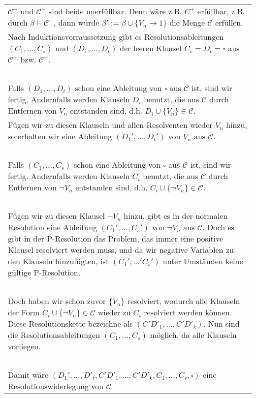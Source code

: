 \documentclass[a4paper,10pt]{article}
\newcommand{\tabspace}{15cm}
\begin{document}
\begin{itemize}
		\begin{tabular}{@{} p{\tabspace}}
		$\mathcal{C}^+$ und $\mathcal{C}^-$ sind beide unerfüllbar. Denn wäre z.B. $C^+$ erfüllbar, z.B. durch $\beta \vDash \mathcal{C}^+$, dann würde $\beta' := \beta \cup \{V_n \rightarrow 1 \}$ die Menge $\mathcal{C}$ erfüllen. \\
		Nach Induktionsvorraussetzung gibt es Resolutionsableitungen $(C_1,...,C_s)$ und $(D_1,...,D_t)$ der leeren Klausel $C_s = D_t = \square$ aus $\mathcal{C}^+$ bzw. $\mathcal{C}^-$. \\
		 \ \\
		Falls  $(D_1,...,D_t)$  schon eine Ableitung von $\square$ aus $\mathcal{C}$ ist, sind wir fertig. Andernfalls werden Klauseln $D_i$ benutzt, die aus $\mathcal{C}$ durch Entfernen von $V_n$ entstanden sind, d.h. $D_i \cup \{V_n \} \in \mathcal{C}$. \\
		Fügen wir zu diesen Klauseln und allen Resolventen wieder $V_n$ hinzu, so erhalten wir eine Ableitung $(D_1',...,D_t')$ von $V_n$ aus $\mathcal{C}$. \\
		 \ \\
		 Falls $(C_1,..., C_s)$ schon eine Ableitung von $\square$ aus $\mathcal{C}$ ist, sind wir fertig. Andernfalls werden Klauseln $C_i$ benutzt, die aus $\mathcal{C}$ durch Entfernen von $\lnot V_n$ entstanden sind, d.h. $C_i \cup \{\lnot V_n \} \in \mathcal{C}$. \\
		\ \\
		Fügen wir zu diesen Klausel $\lnot V_n$ hinzu, gibt es in der normalen Resolution eine Ableitung $(C_1',...,C_s')$ von $\lnot V_n$ aus $\mathcal{C}$. Doch es gibt in der P-Resolution das Problem, das immer eine positive Klausel resolviert werden muss, und da wir negative Variablen zu den Klauseln hinzufügten, ist $(C_1',...'C_s')$ unter Umständen keine gültige P-Resolution. \\
		\ \\
		Doch haben wir schon zuvor $\{V_n \}$ resolviert, wodurch alle Klauseln der Form $C_i \cup \{\lnot V_n \} \in \mathcal{C}$ wieder zu $C_i$ resolviert werden können. Diese Resolutionskette bezeichne als $(C'D'_1,...,C'D'_k)$. Nun sind die Resolutionsableitungen $(C_1,..., C_s)$ möglich, da alle Klauseln vorliegen. \\
		\ \\
		Damit wäre $(D_1',...,D'_t,C'D'_1,...,C'D'_k,C_1,...,C_s,\square)$ eine Resolutionswiderlegung von $\mathcal{C}$ 
	\end{tabular}
\end{itemize}
\end{document}
